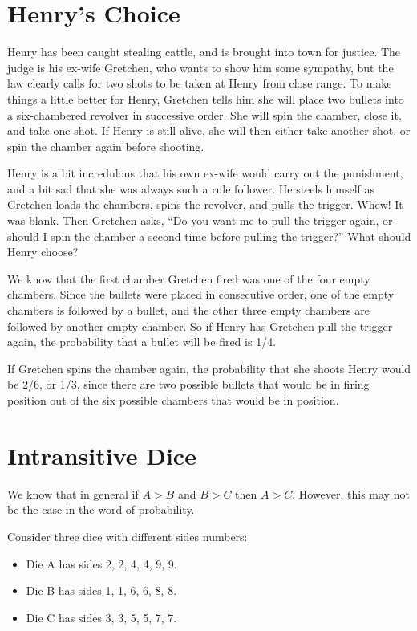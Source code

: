 \hypertarget{Henry-Choice}{%
  \section{Henry's Choice}\label{Henry-Choice}}

Henry has been caught stealing cattle, and is brought into town for justice. The
judge is his ex-wife Gretchen, who wants to show him some sympathy, but the law
clearly calls for two shots to be taken at Henry from close range. To make
things a little better for Henry, Gretchen tells him she will place two bullets
into a six-chambered revolver in successive order. She will spin the chamber,
close it, and take one shot. If Henry is still alive, she will then either take
another shot, or spin the chamber again before shooting.

Henry is a bit incredulous that his own ex-wife would carry out the punishment,
and a bit sad that she was always such a rule follower. He steels himself as
Gretchen loads the chambers, spins the revolver, and pulls the trigger. Whew! It
was blank. Then Gretchen asks, ``Do you want me to pull the trigger again, or
should I spin the chamber a second time before pulling the trigger?'' What
should Henry choose?

We know that the first chamber Gretchen fired was one of the four empty
chambers. Since the bullets were placed in consecutive order, one of the empty
chambers is followed by a bullet, and the other three empty chambers are
followed by another empty chamber. So if Henry has Gretchen pull the trigger
again, the probability that a bullet will be fired is 1/4.

If Gretchen spins the chamber again, the probability that she shoots Henry would
be 2/6, or 1/3, since there are two possible bullets that would be in firing
position out of the six possible chambers that would be in position.



\hypertarget{Intransitive-Dice}{%
  \section{Intransitive Dice}\label{Intransitive-Dice}}

We know that in general if $A>B$ and $B>C$ then $A>C$. However, this may not be
the case in the word of probability.

Consider three dice with different sides numbers:
\begin{itemize}
\item Die A has sides 2, 2, 4, 4, 9, 9.
\item Die B has sides 1, 1, 6, 6, 8, 8.
\item Die C has sides 3, 3, 5, 5, 7, 7.
\end{itemize}

